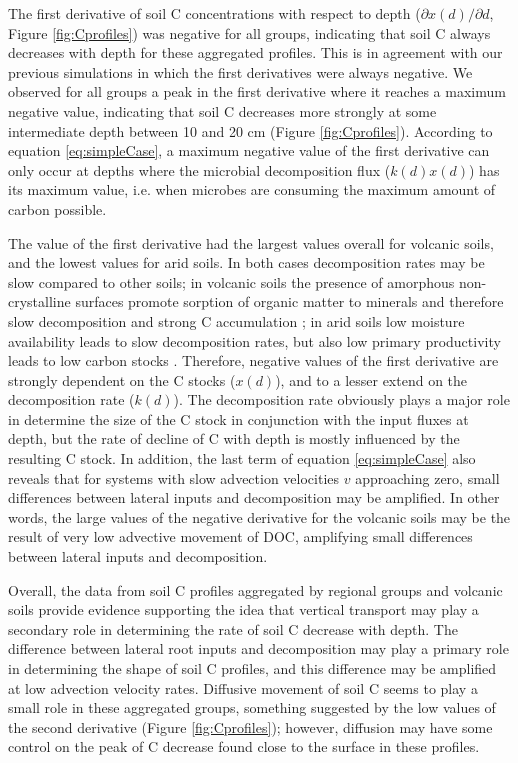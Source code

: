 \documentclass[11pt, oneside, a4paper]{article}   	%
\begin{document}
The first derivative of soil C concentrations with respect to depth ($\partial x(d)/ \partial d$, Figure \ref{fig:Cprofiles})  was negative for all groups, indicating that soil C always decreases with depth for these aggregated profiles. This is in  agreement with our previous simulations in which the first derivatives were always negative. We observed for all groups a peak in the first derivative where it reaches a maximum negative value, indicating that soil C decreases more strongly at some intermediate depth between 10 and 20 cm (Figure \ref{fig:Cprofiles}). According to equation \ref{eq:simpleCase}, a maximum negative value of the first derivative can only occur at depths where the microbial decomposition flux ($k(d) x(d)$) has its maximum value, i.e. when microbes are consuming the maximum amount of carbon possible.

The value of the first derivative had the largest values overall for volcanic soils, and the lowest values for arid soils. In both cases decomposition rates may be slow compared to other soils; in volcanic soils the presence of amorphous non-crystalline surfaces promote sorption of organic matter to minerals and therefore slow decomposition and strong C accumulation \citep{Marin-Spiotta2011, Crow2015}; in arid soils low moisture availability leads to slow decomposition rates, but also low primary productivity leads to low carbon stocks \citep{Moyano2013, Sierra2015JAMES}. Therefore, negative values of the first derivative are strongly dependent on the C stocks ($x(d)$), and to a lesser extend on the decomposition rate ($k(d)$). The decomposition rate obviously plays a major role in determine the size of the C stock in conjunction with the input fluxes at depth, but the rate of decline of C with depth is mostly influenced by the resulting C stock. In addition, the last term of equation \ref{eq:simpleCase} also reveals that for systems with slow advection velocities $v$ approaching zero, small differences between lateral inputs and decomposition may be amplified. In other words, the large values of the negative derivative for the volcanic soils may be the result of very low advective movement of DOC, amplifying small differences between lateral inputs and decomposition.

Overall, the data from soil C profiles aggregated by regional groups and volcanic soils provide evidence supporting the idea that vertical transport may play a secondary role in determining the rate of soil C decrease with depth. The difference between lateral root inputs and decomposition may play a primary role in determining the shape of soil C profiles, and this difference may be amplified at low advection velocity rates. Diffusive movement of soil C seems to play a small role in these aggregated groups, something suggested by the low values of the second derivative (Figure \ref{fig:Cprofiles}); however, diffusion may have some control on the peak of C decrease found close to the surface in these profiles. 
\end{document}
